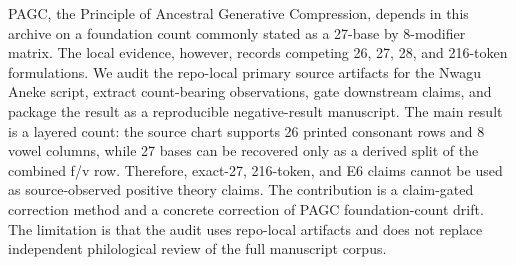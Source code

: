 PAGC, the Principle of Ancestral Generative Compression, depends in this archive on a foundation count commonly stated as a 27-base by 8-modifier matrix. The local evidence, however, records competing 26, 27, 28, and 216-token formulations. We audit the repo-local primary source artifacts for the Nwagu Aneke script, extract count-bearing observations, gate downstream claims, and package the result as a reproducible negative-result manuscript. The main result is a layered count: the source chart supports 26 printed consonant rows and 8 vowel columns, while 27 bases can be recovered only as a derived split of the combined f/v row. Therefore, exact-27, 216-token, and E6 claims cannot be used as source-observed positive theory claims. The contribution is a claim-gated correction method and a concrete correction of PAGC foundation-count drift. The limitation is that the audit uses repo-local artifacts and does not replace independent philological review of the full manuscript corpus.
